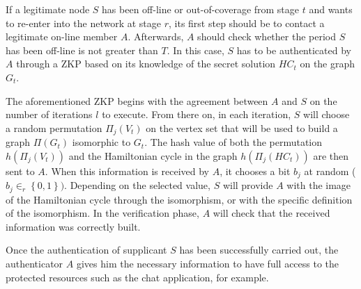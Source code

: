 \documentclass[conference]{IEEEtran}
\begin{document}
If a legitimate node $S$ has been off-line
or out-of-coverage from stage $t$ and wants to re-enter into the
network at stage $r$, its first step should be to contact a
legitimate on-line member $A$. Afterwards, $A$ should check
whether the period $S$ has been off-line is not greater than $T$. In
this case, $S$ has to be authenticated by $A$ through a ZKP based on its
knowledge of the secret solution $HC_t$ on the graph $G_t$.

The aforementioned ZKP begins with the agreement between $A$ and
$S$ on the number of iterations $l$ to execute. From there on, in
each iteration, $S$ will choose a random permutation
${\Pi}_j(V_t)$ on the vertex set that will be used to build a
graph ${\Pi}(G_t)$ isomorphic to $G_t$. The hash value of both the
permutation $h({\Pi}_j(V_t))$ and the Hamiltonian cycle in the
graph  $h({\Pi}_j(HC_t))$ are then sent to $A$. When this
information is received by $A$, it chooses a bit $b_j$ at random
($b_j \in_r \left\{0,1\right \}) $. Depending on the selected
value, $S$ will provide $A$ with the image  of the Hamiltonian
cycle through the isomorphism, or with the specific definition of
the isomorphism. In the verification phase, $A$ will check that
the received information was correctly built.

Once the authentication of supplicant $S$ has been successfully
carried out, the authenticator $A$ gives him the necessary
information to have full access to the protected resources such as
the chat application, for example.
\end{document}
